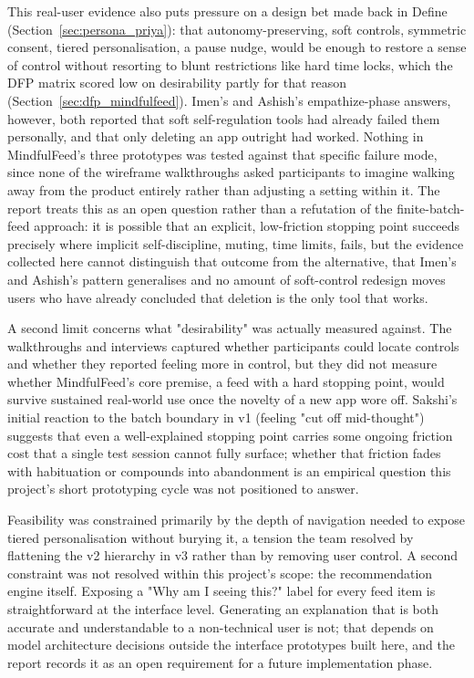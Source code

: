 \documentclass[11pt]{article}
\begin{document}
This real-user evidence also puts pressure on a design bet made back in Define (Section~\ref{sec:persona_priya}): that autonomy-preserving, soft controls, symmetric consent, tiered personalisation, a pause nudge, would be enough to restore a sense of control without resorting to blunt restrictions like hard time locks, which the DFP matrix scored low on desirability partly for that reason (Section~\ref{sec:dfp_mindfulfeed}). Imen's and Ashish's empathize-phase answers, however, both reported that soft self-regulation tools had already failed them personally, and that only deleting an app outright had worked. Nothing in MindfulFeed's three prototypes was tested against that specific failure mode, since none of the wireframe walkthroughs asked participants to imagine walking away from the product entirely rather than adjusting a setting within it. The report treats this as an open question rather than a refutation of the finite-batch-feed approach: it is possible that an explicit, low-friction stopping point succeeds precisely where implicit self-discipline, muting, time limits, fails, but the evidence collected here cannot distinguish that outcome from the alternative, that Imen's and Ashish's pattern generalises and no amount of soft-control redesign moves users who have already concluded that deletion is the only tool that works.

A second limit concerns what "desirability" was actually measured against. The walkthroughs and interviews captured whether participants could locate controls and whether they reported feeling more in control, but they did not measure whether MindfulFeed's core premise, a feed with a hard stopping point, would survive sustained real-world use once the novelty of a new app wore off. Sakshi's initial reaction to the batch boundary in v1 (feeling "cut off mid-thought") suggests that even a well-explained stopping point carries some ongoing friction cost that a single test session cannot fully surface; whether that friction fades with habituation or compounds into abandonment is an empirical question this project's short prototyping cycle was not positioned to answer.

Feasibility was constrained primarily by the depth of navigation needed to expose tiered personalisation without burying it, a tension the team resolved by flattening the v2 hierarchy in v3 rather than by removing user control. A second constraint was not resolved within this project's scope: the recommendation engine itself. Exposing a "Why am I seeing this?" label for every feed item is straightforward at the interface level. Generating an explanation that is both accurate and understandable to a non-technical user is not; that depends on model architecture decisions outside the interface prototypes built here, and the report records it as an open requirement for a future implementation phase.
\end{document}
